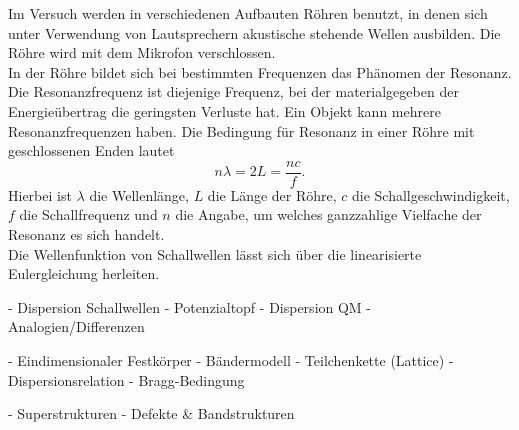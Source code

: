 Im Versuch werden in verschiedenen Aufbauten Röhren benutzt, in denen sich unter Verwendung von Lautsprechern akustische stehende Wellen ausbilden.
Die Röhre wird mit dem Mikrofon verschlossen.\\
%
In der Röhre bildet sich bei bestimmten Frequenzen das Phänomen der Resonanz.
Die Resonanzfrequenz ist diejenige Frequenz, bei der materialgegeben der Energieübertrag die geringsten Verluste hat.
Ein Objekt kann mehrere Resonanzfrequenzen haben.
Die Bedingung für Resonanz in einer Röhre mit geschlossenen Enden lautet
\begin{equation*}
  n \lambda = 2 L = \frac{n c}{f}.
\end{equation*}
Hierbei ist $\lambda$ die Wellenlänge, $L$ die Länge der Röhre, $c$ die Schallgeschwindigkeit, $f$ die Schallfrequenz und $n$ die Angabe, um welches ganzzahlige Vielfache der Resonanz es sich handelt.\\
%
Die Wellenfunktion von Schallwellen lässt sich über die linearisierte Eulergleichung herleiten.

    - Dispersion Schallwellen
- Potenzialtopf
    - Dispersion QM
- Analogien/Differenzen

- Eindimensionaler Festkörper
    - Bändermodell
    - Teilchenkette (Lattice)
    - Dispersionsrelation
    - Bragg-Bedingung

- Superstrukturen
    - Defekte & Bandstrukturen
